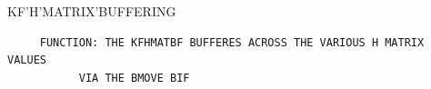 \begin{frame}
KF'H'MATRIX'BUFFERING
\begin{verbatim}
     FUNCTION: THE KFHMATBF BUFFERES ACROSS THE VARIOUS H MATRIX VALUES
           VIA THE BMOVE BIF



\end{verbatim}
\end{frame}
